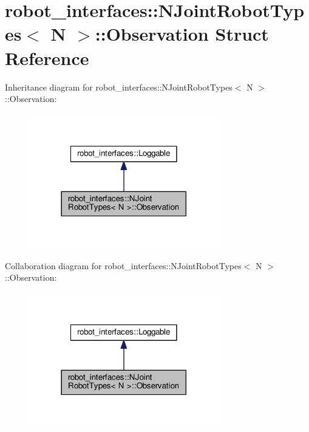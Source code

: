 \hypertarget{structrobot__interfaces_1_1NJointRobotTypes_1_1Observation}{}\section{robot\+\_\+interfaces\+:\+:N\+Joint\+Robot\+Types$<$ N $>$\+:\+:Observation Struct Reference}
\label{structrobot__interfaces_1_1NJointRobotTypes_1_1Observation}


Inheritance diagram for robot\+\_\+interfaces\+:\+:N\+Joint\+Robot\+Types$<$ N $>$\+:\+:Observation\+:
\nopagebreak
\begin{figure}[H]
\begin{center}
\leavevmode
\includegraphics[width=234pt]{structrobot__interfaces_1_1NJointRobotTypes_1_1Observation__inherit__graph}
\end{center}
\end{figure}


Collaboration diagram for robot\+\_\+interfaces\+:\+:N\+Joint\+Robot\+Types$<$ N $>$\+:\+:Observation\+:
\nopagebreak
\begin{figure}[H]
\begin{center}
\leavevmode
\includegraphics[width=234pt]{structrobot__interfaces_1_1NJointRobotTypes_1_1Observation__coll__graph}
\end{center}
\end{figure}
